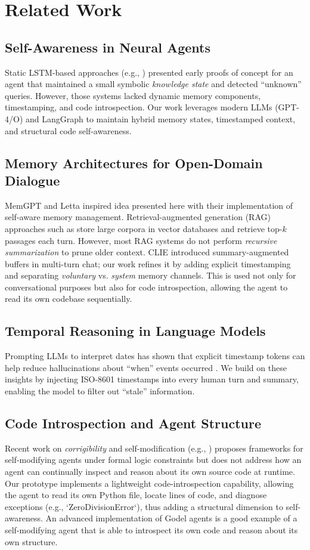 \documentclass[11pt]{article}
\begin{document}
\section{Related Work}

\subsection{Self-Awareness in Neural Agents}
Static LSTM-based approaches (e.g., \cite{Mukai2020}) presented early proofs of concept for an agent that maintained a small symbolic \emph{knowledge state} and detected “unknown” queries. However, those systems lacked dynamic memory components, timestamping, and code introspection. Our work leverages modern LLMs (GPT-4/O) \cite{ChenGupta2024} and LangGraph to maintain hybrid memory states, timestamped context, and structural code self-awareness.

\subsection{Memory Architectures for Open-Domain Dialogue}
MemGPT and Letta inspired idea presented here \cite{letta2024} with their implementation of self-aware memory management.  Retrieval-augmented generation (RAG) approaches such as \cite{Lewis2020} store large corpora in vector databases and retrieve top-$k$ passages each turn. However, most RAG systems do not perform \emph{recursive summarization} to prune older context. CLIE \cite{Sanh2022} introduced summary-augmented buffers in multi-turn chat; our work refines it by adding explicit timestamping and separating \emph{voluntary} vs. \emph{system} memory channels.  This is used not only for conversational purposes but also for code introspection, allowing the agent to read its own codebase sequentially.

\subsection{Temporal Reasoning in Language Models}
Prompting LLMs to interpret dates has shown that explicit timestamp tokens can help reduce hallucinations about “when” events occurred \cite{Zhang2023}. We build on these insights by injecting ISO-8601 timestamps into every human turn and summary, enabling the model to filter out “stale” information.

\subsection{Code Introspection and Agent Structure}
Recent work on \emph{corrigibility} and self-modification (e.g., \cite{Soares2015}) proposes frameworks for self-modifying agents under formal logic constraints but does not address how an agent can continually inspect and reason about its own source code at runtime. Our prototype implements a lightweight code-introspection capability, allowing the agent to read its own Python file, locate lines of code, and diagnose exceptions (e.g., `ZeroDivisionError`), thus adding a structural dimension to self-awareness.  An advanced implementation of Godel agents \cite{yin2024godel} is a good example of a self-modifying agent that is able to introspect its own code and reason about its own structure.
\end{document}
